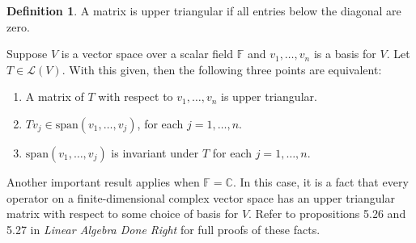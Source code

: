 \documentclass{article}
\renewcommand{\L}{\mathcal{L}}
\newcommand{\spans}{\mathrm{span}}
\newcommand{\F}{\mathbb{F}}
\newcommand{\C}{\mathbb{C}}
\theoremstyle{definition}
\newtheorem{definition}{Definition}
\begin{document}
\begin{definition}
    A matrix is upper triangular if all entries below the diagonal are zero.
\end{definition}
Suppose $V$ is a vector space over a scalar field $\F$ and $v_1, \dots, v_n$ is a basis for $V$. Let $T \in \L(V)$. With this given, then the following three points are equivalent:
\begin{enumerate}[label=(\alph*)]
    \item A matrix of $T$ with respect to $v_1, \dots, v_n$ is upper triangular.
    \item $Tv_j \in \spans(v_1, \dots, v_j)$, for each $j = 1, \dots, n$.
    \item $\spans(v_1, \dots, v_j)$ is invariant under $T$ for each $j = 1, \dots, n$.
\end{enumerate}
Another important result applies when $\F = \C$. In this case, it is a fact that every operator on a finite-dimensional complex vector space has an upper triangular matrix with respect to some choice of basis for $V$. Refer to propositions 5.26 and 5.27 in \textit{Linear Algebra Done Right} for full proofs of these facts.
\end{document}
